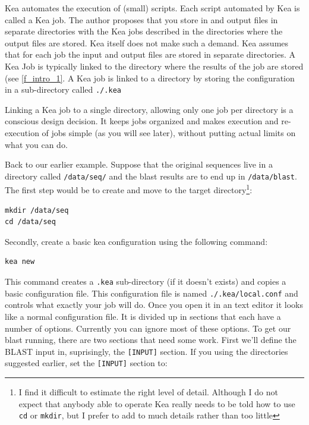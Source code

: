Kea automates the execution of (small) scripts. Each script automated
by Kea is called a Kea job. The author proposes that you store in and
output files in separate directories with the Kea jobs described in
the directories where the output files are stored. Kea itself does not
make such a demand. Kea assumes that for each job the input
and output files are stored in separate directories. A Kea Job is
typically linked to the directory where the results of the job are
stored (see \ref{f_intro_1}. A Kea job is linked to a directory by
storing the configuration in a sub-directory called \lstinline{./.kea}

Linking a Kea job to a single directory, allowing only one job per
directory is a conscious design decision. It keeps jobs organized and
makes execution and re-execution of jobs simple (as you will see
later), without putting actual limits on what you can do.

Back to our earlier example. Suppose that the original sequences live
in a directory called \lstinline{/data/seq/} and the blast results are
to end up in \lstinline{/data/blast}. The first step would be to
create and move to the target directory\footnote{I find it difficult
  to estimate the right level of detail. Although I do not expect that
  anybody able to operate Kea really needs to be told how to use
  \lstinline!cd! or \lstinline{mkdir}, but I prefer to add to much
  details rather than too little}:

\begin{lstlisting}
mkdir /data/seq
cd /data/seq
\end{lstlisting}

Secondly, create a basic kea configuration using the following
command:

\begin{lstlisting}
kea new
\end{lstlisting}

This command creates a \lstinline!.kea! sub-directory (if it doesn't
exists) and copies a basic configuration file. This configuration file
is named \lstinline!./.kea/local.conf! and controls what exactly your
job will do. Once you open it in an text editor it looks like a normal
configuration file. It is divided up in sections that each have a
number of options. Currently you can ignore most of these options. To
get our blast running, there are two sections that need some
work. First we'll define the BLAST input in, suprisingly, the
\lstinline![INPUT]! section. If you using the directories suggested
earlier, set the \lstinline![INPUT]! section to:

